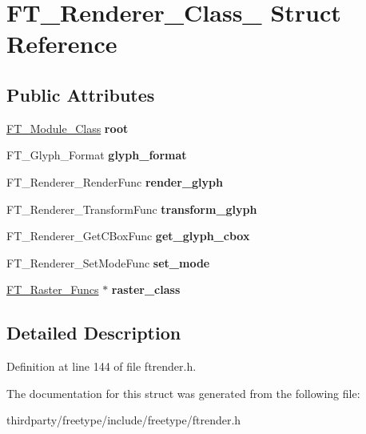 \hypertarget{struct_f_t___renderer___class__}{}\section{F\+T\+\_\+\+Renderer\+\_\+\+Class\+\_\+ Struct Reference}
\label{struct_f_t___renderer___class__}
\subsection*{Public Attributes}
\begin{DoxyCompactItemize}
\item 
\mbox{\label{struct_f_t___renderer___class___a3df4509f1de704596bf4237d6ff8cbd4}} 
\hyperlink{struct_f_t___module___class__}{F\+T\+\_\+\+Module\+\_\+\+Class} {\bfseries root}
\item 
\mbox{\label{struct_f_t___renderer___class___a2c8602452fae27379a6f85bbcb4b525c}} 
F\+T\+\_\+\+Glyph\+\_\+\+Format {\bfseries glyph\+\_\+format}
\item 
\mbox{\label{struct_f_t___renderer___class___a7a022b8358ce3a06620c62f3542d0d2b}} 
F\+T\+\_\+\+Renderer\+\_\+\+Render\+Func {\bfseries render\+\_\+glyph}
\item 
\mbox{\label{struct_f_t___renderer___class___a2aef09ecdabacf5628ef29fb3d179def}} 
F\+T\+\_\+\+Renderer\+\_\+\+Transform\+Func {\bfseries transform\+\_\+glyph}
\item 
\mbox{\label{struct_f_t___renderer___class___a4f9dc9b6d86504a8d3b04b4e72936e76}} 
F\+T\+\_\+\+Renderer\+\_\+\+Get\+C\+Box\+Func {\bfseries get\+\_\+glyph\+\_\+cbox}
\item 
\mbox{\label{struct_f_t___renderer___class___a7cfd4795107157aad4f7efcab77a0f64}} 
F\+T\+\_\+\+Renderer\+\_\+\+Set\+Mode\+Func {\bfseries set\+\_\+mode}
\item 
\mbox{\label{struct_f_t___renderer___class___a5af75b9f582f98f9f74dbcbc530c7e88}} 
\hyperlink{struct_f_t___raster___funcs__}{F\+T\+\_\+\+Raster\+\_\+\+Funcs} $\ast$ {\bfseries raster\+\_\+class}
\end{DoxyCompactItemize}


\subsection{Detailed Description}


Definition at line 144 of file ftrender.\+h.



The documentation for this struct was generated from the following file\+:\begin{DoxyCompactItemize}
\item 
thirdparty/freetype/include/freetype/ftrender.\+h\end{DoxyCompactItemize}
